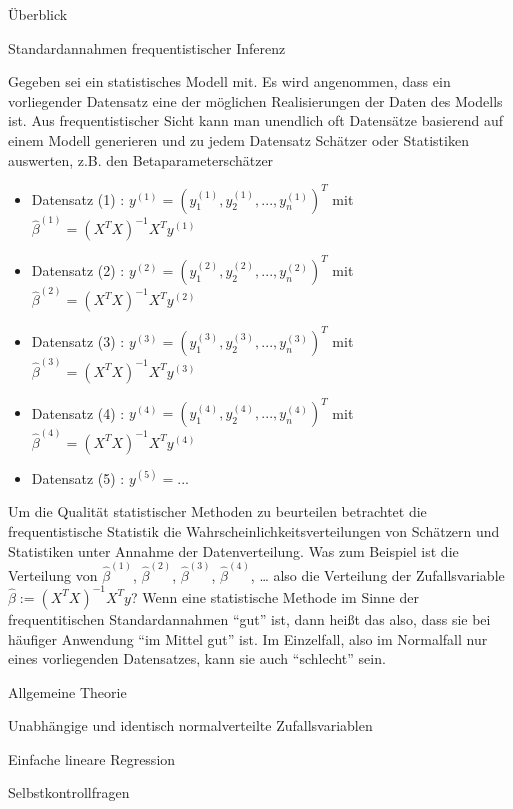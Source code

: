 \documentclass[
  8pt,
  ignorenonframetext,
]{beamer}
\begin{document}
\begin{frame}{Überblick}
\protect\hypertarget{uxfcberblick-4}{}
\small

Standardannahmen frequentistischer Inferenz

\footnotesize
{}

Gegeben sei ein statistisches Modell mit. Es wird angenommen, dass ein
vorliegender Datensatz eine der möglichen Realisierungen der Daten des
Modells ist. Aus frequentistischer Sicht kann man unendlich oft
Datensätze basierend auf einem Modell generieren und zu jedem Datensatz
Schätzer oder Statistiken auswerten, z.B. den Betaparameterschätzer
\vspace{1mm}

\begin{itemize}
\item[] Datensatz (1) : $y^{(1)} = \left(y_1^{(1)}, y_2^{(1)}, ...,y_n^{(1)}\right)^T$  mit $\hat{\beta}^{(1)} = (X^TX)^{-1}X^Ty^{(1)}$
\item[] Datensatz (2) : $y^{(2)} = \left(y_1^{(2)}, y_2^{(2)}, ...,y_n^{(2)}\right)^T$  mit $\hat{\beta}^{(2)} = (X^TX)^{-1}X^Ty^{(2)}$
\item[] Datensatz (3) : $y^{(3)} = \left(y_1^{(3)}, y_2^{(3)}, ...,y_n^{(3)}\right)^T$  mit $\hat{\beta}^{(3)} = (X^TX)^{-1}X^Ty^{(3)}$
\item[] Datensatz (4) : $y^{(4)} = \left(y_1^{(4)}, y_2^{(4)}, ...,y_n^{(4)}\right)^T$  mit $\hat{\beta}^{(4)} = (X^TX)^{-1}X^Ty^{(4)}$
\item[] Datensatz (5) : $y^{(5)} = ...$
\end{itemize}

\vspace{1mm}

Um die Qualität statistischer Methoden zu beurteilen betrachtet die
frequentistische Statistik die Wahrscheinlichkeitsverteilungen von
Schätzern und Statistiken unter Annahme der Datenverteilung. Was zum
Beispiel ist die Verteilung von \(\hat{\beta}^{(1)}\),
\(\hat{\beta}^{(2)}\), \(\hat{\beta}^{(3)}\), \(\hat{\beta}^{(4)}\),
\ldots{} also die Verteilung der Zufallsvariable
\(\hat{\beta} := (X^TX)^{-1}X^Ty\)? Wenn eine statistische Methode im
Sinne der frequentitischen Standardannahmen ``gut'' ist, dann heißt das
also, dass sie bei häufiger Anwendung ``im Mittel gut'' ist. Im
Einzelfall, also im Normalfall nur eines vorliegenden Datensatzes, kann
sie auch ``schlecht'' sein.
\end{frame}

\begin{frame}{}
\protect\hypertarget{section-2}{}
\large
{}
\vfill

Allgemeine Theorie

Unabhängige und identisch normalverteilte Zufallsvariablen

Einfache lineare Regression

Selbstkontrollfragen \vfill
\end{frame}
\end{document}
